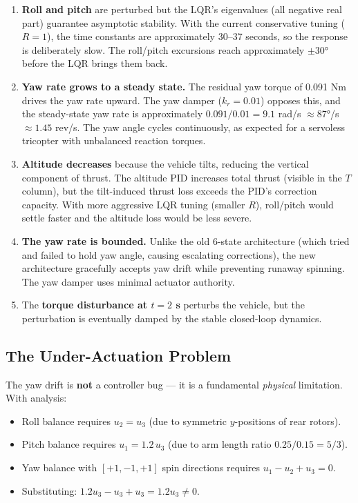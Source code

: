 \documentclass[12pt, a4paper]{article}
\begin{document}
\begin{enumerate}
    \item \textbf{Roll and pitch} are perturbed but the LQR's eigenvalues (all negative real part) guarantee asymptotic stability.  With the current conservative tuning ($R = 1$), the time constants are approximately 30--37 seconds, so the response is deliberately slow.  The roll/pitch excursions reach approximately $\pm 30°$ before the LQR brings them back.

    \item \textbf{Yaw rate grows to a steady state.}  The residual yaw torque of 0.091 Nm drives the yaw rate upward.  The yaw damper ($k_r = 0.01$) opposes this, and the steady-state yaw rate is approximately $0.091 / 0.01 = 9.1$ rad/s $\approx 87°$/s $\approx 1.45$ rev/s.  The yaw angle cycles continuously, as expected for a servoless tricopter with unbalanced reaction torques.

    \item \textbf{Altitude decreases} because the vehicle tilts, reducing the vertical component of thrust.  The altitude PID increases total thrust (visible in the $T$ column), but the tilt-induced thrust loss exceeds the PID's correction capacity.  With more aggressive LQR tuning (smaller $R$), roll/pitch would settle faster and the altitude loss would be less severe.

    \item \textbf{The yaw rate is bounded.}  Unlike the old 6-state architecture (which tried and failed to hold yaw angle, causing escalating corrections), the new architecture gracefully accepts yaw drift while preventing runaway spinning.  The yaw damper uses minimal actuator authority.

    \item The \textbf{torque disturbance at $t = 2$ s} perturbs the vehicle, but the perturbation is eventually damped by the stable closed-loop dynamics.
\end{enumerate}

\subsection{The Under-Actuation Problem}

The yaw drift is \textbf{not} a controller bug --- it is a fundamental \emph{physical} limitation.  With analysis:
\begin{itemize}
    \item Roll balance requires $u_2 = u_3$ (due to symmetric $y$-positions of rear rotors).
    \item Pitch balance requires $u_1 = 1.2 \, u_3$ (due to arm length ratio $0.25/0.15 = 5/3$).
    \item Yaw balance with $[+1, -1, +1]$ spin directions requires $u_1 - u_2 + u_3 = 0$.
    \item Substituting: $1.2 u_3 - u_3 + u_3 = 1.2 u_3 \neq 0$.
\end{itemize}
\end{document}
